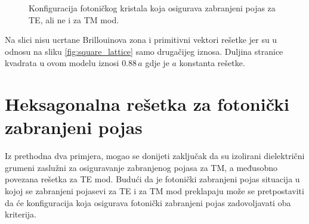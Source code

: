 \documentclass[utf8, seminar, numeric]{fer}
\begin{document}
\begin{figure}[ht]
\centering
    \qquad
	\caption{Konfiguracija fotoničkog kristala koja osigurava zabranjeni pojas
	za TE, ali ne i za TM mod.}
	\label{fig:square_lattice_holes}
\end{figure}

Na slici nisu ucrtane Brillouinova zona i primitivni vektori rešetke jer su u
odnosu na sliku \ref{fig:square_lattice} samo drugačijeg iznosa. Duljina stranice
kvadrata u ovom modelu iznosi $0.88 \, a$ gdje je $a$ konstanta rešetke.

\FloatBarrier

\section {Heksagonalna rešetka za fotonički zabranjeni pojas}\label{sec:fbg}

Iz prethodna dva primjera, mogao se donijeti zaključak da su izolirani
dielektrični grumeni zaslužni za osiguravanje zabranjenog pojasa za TM, a
međusobno povezana rešetka za TE mod. Budući da je fotonički zabranjeni pojas
situacija u kojoj se zabranjeni pojasevi za TE i za TM mod preklapaju može se
pretpostaviti da će konfiguracija koja osigurava fotonički zabranjeni pojas
zadovoljavati oba kriterija.
\end{document}
